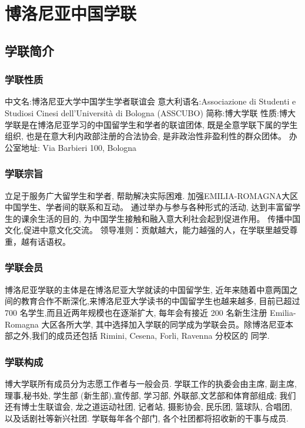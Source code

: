 \chapter{博洛尼亚中国学联}              

\section{学联简介}

\subsection{学联性质}
中文名:博洛尼亚大学中国学生学者联谊会 
意大利语名:Associazione di Studenti e Studiosi Cinesi dell'Università di Bologna (ASSCUBO)
简称:博大学联
性质:博大学联是在博洛尼亚学习的中国留学生和学者的联谊团体, 既是全意学联下属的学生组织, 也是在意大利内政部注册的合法协会, 是非政治性非盈利性的群众团体。 
办公室地址: Via Barbieri 100, Bologna

\subsection{学联宗旨}
立足于服务广大留学生和学者, 帮助解决实际困难. 
加强EMILIA-ROMAGNA大区中国学生、学者间的联系和互动。 
通过举办与参与各种形式的活动, 达到丰富留学生的课余生活的目的, 为中国学生接触和融入意大利社会起到促进作用。 
 传播中国文化,促进中意文化交流。 领导准则：贡献越大，能力越强的人，在学联里越受尊重，越有话语权。

\subsection{学联会员}
博洛尼亚学联的主体是在博洛尼亚大学就读的中国留学生, 近年来随着中意两国之间的教育合作不断深化,来博洛尼亚大学读书的中国留学生也越来越多, 目前已超过 700 名学生,而且近两年规模也在逐渐扩大, 每年会有接近 200 名新生注册 Emilia-Romagna 大区各所大学, 其中选择加入学联的同学成为学联会员。除博洛尼亚本部之外,我们的成员还包括 Rimini, Cesena, Forli, Ravenna 分校区的 同学. 

\subsection{学联构成}
博大学联所有成员分为志愿工作者与一般会员. 学联工作的执委会由主席, 副主席,理事,秘书处, 学生部 (新生部),宣传部, 学习部, 外联部,文艺部和体育部组成; 我们还有博士生联谊会, 龙之道运动社团, 记者站, 摄影协会, 民乐团, 篮球队, 合唱团, 以及话剧社等新兴社团. 学联每年各个部门, 各个社团都将招收新的干事与成员. 

